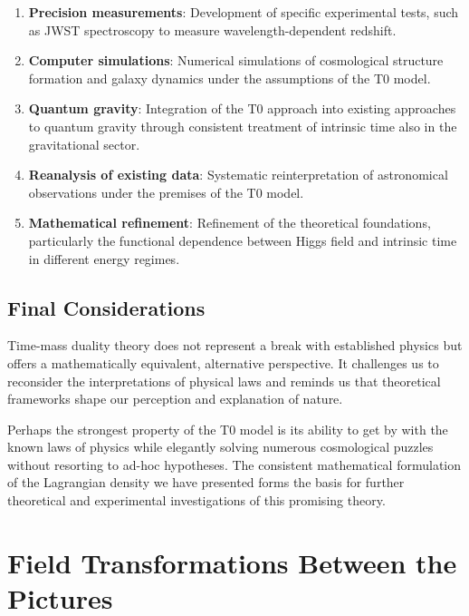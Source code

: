 \documentclass{article}
\theoremstyle{definition}
\theoremstyle{remark}
\begin{document}
	\begin{enumerate}
		\item \textbf{Precision measurements}: Development of specific experimental tests, such as JWST spectroscopy to measure wavelength-dependent redshift.
		
		\item \textbf{Computer simulations}: Numerical simulations of cosmological structure formation and galaxy dynamics under the assumptions of the T0 model.
		
		\item \textbf{Quantum gravity}: Integration of the T0 approach into existing approaches to quantum gravity through consistent treatment of intrinsic time also in the gravitational sector.
		
		\item \textbf{Reanalysis of existing data}: Systematic reinterpretation of astronomical observations under the premises of the T0 model.
		
		\item \textbf{Mathematical refinement}: Refinement of the theoretical foundations, particularly the functional dependence between Higgs field and intrinsic time in different energy regimes.
	\end{enumerate}
	
	\subsection{Final Considerations}
	
	Time-mass duality theory does not represent a break with established physics but offers a mathematically equivalent, alternative perspective. It challenges us to reconsider the interpretations of physical laws and reminds us that theoretical frameworks shape our perception and explanation of nature.
	
	Perhaps the strongest property of the T0 model is its ability to get by with the known laws of physics while elegantly solving numerous cosmological puzzles without resorting to ad-hoc hypotheses. The consistent mathematical formulation of the Lagrangian density we have presented forms the basis for further theoretical and experimental investigations of this promising theory.
	\appendix
	
	\section{Field Transformations Between the Pictures}
	
\end{document}
